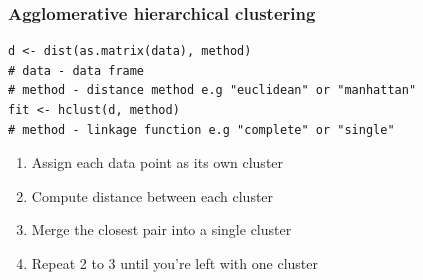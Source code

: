 \documentclass[pdf]{beamer}
\begin{document}
\begin{frame}[fragile]
\frametitle{Agglomerative hierarchical clustering}
\begin{lstlisting}[style=RCode]
d <- dist(as.matrix(data), method)
# data - data frame 
# method - distance method e.g "euclidean" or "manhattan"
fit <- hclust(d, method) 
# method - linkage function e.g "complete" or "single"
\end{lstlisting}
\begin{enumerate}\addtolength{\itemsep}{0.5\baselineskip}
	\item<2-> Assign each data point as its own cluster
	\item<3-> Compute distance between each cluster
	\item<4-> Merge the closest pair into a single cluster
	\item<5-> Repeat 2 to 3 until you're left with one cluster
\end{enumerate}
\vfill
{}
\end{frame}
\end{document}
